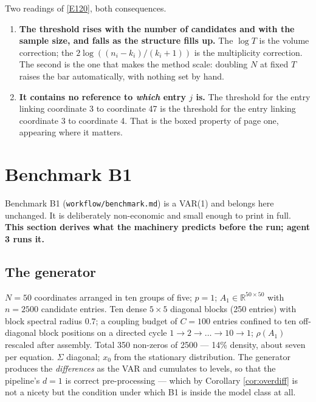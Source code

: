 \noindent Two readings of \eqref{E120}, both consequences.
\begin{enumerate}[label=(\alph*), topsep=0pt, itemsep=0pt]
\item \textbf{The threshold rises with the number of candidates and with the sample
  size, and falls as the structure fills up.} The $\log T$ is the volume correction;
  the $2\log((n_i-k_i)/(k_i+1))$ is the multiplicity correction. The second is the
  one that makes the method scale: doubling $N$ at fixed $T$ raises the bar
  automatically, with nothing set by hand.
\item \textbf{It contains no reference to \emph{which} entry $j$ is.} The threshold
  for the entry linking coordinate 3 to coordinate 47 is the threshold for the entry
  linking coordinate 3 to coordinate 4. That is the boxed property of page one,
  appearing where it matters.
\end{enumerate}



\section{Benchmark B1}\label{sec:bench}

Benchmark B1 (\texttt{workflow/benchmark.md}) is a VAR(1) and belongs here unchanged.
It is deliberately non-economic and small enough to print in full. \textbf{This
section derives what the machinery predicts before the run; agent 3 runs it.}

\subsection{The generator}\label{sec:gen}

$N=50$ coordinates arranged in ten groups of five; $p=1$;
$A_1\in\mathbb{R}^{50\times50}$ with $n=2500$ candidate entries. Ten dense $5\times5$
diagonal blocks (250 entries) with block spectral radius 0.7; a coupling budget of
$C=100$ entries confined to ten off-diagonal block positions on a directed cycle
$1\to2\to\dots\to10\to1$; $\rho(A_1)$ rescaled after assembly. Total 350 non-zeros
of 2500 --- 14\% density, about seven per equation. $\Sigma$ diagonal; $x_0$ from the
stationary distribution. The generator produces the \emph{differences} as the VAR and
cumulates to levels, so that the pipeline's $d=1$ is correct pre-processing --- which
by Corollary \ref{cor:overdiff} is not a nicety but the condition under which B1 is
inside the model class at all.

